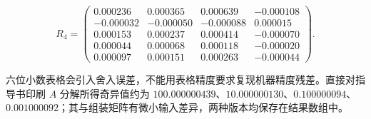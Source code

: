 \documentclass[UTF8,a4paper,11pt,fontset=fandol]{ctexart}
\begin{document}
\[R_4=\begin{pmatrix}0.000236 & 0.000365 & 0.000639 & -0.000108\\-0.000032 & -0.000050 & -0.000088 & 0.000015\\0.000153 & 0.000237 & 0.000414 & -0.000070\\0.000044 & 0.000068 & 0.000118 & -0.000020\\0.000097 & 0.000151 & 0.000263 & -0.000044\end{pmatrix}.\]

六位小数表格会引入舍入误差，不能用表格精度要求复现机器精度残差。直接对指导书印刷 $A$ 分解所得奇异值约为 $100.000000439$、$10.000000130$、$0.100000094$、$0.001000092$；其与组装矩阵有微小输入差异，两种版本均保存在结果数组中。
\end{document}
